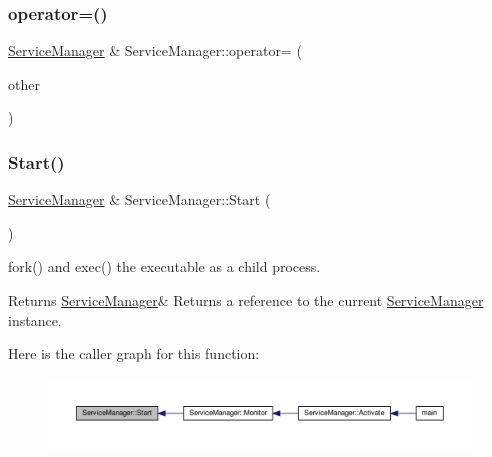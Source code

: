 \subsubsection{\texorpdfstring{operator=()}{operator=()}\hspace{0.1cm}{\footnotesize\ttfamily [2/2]}}
{\footnotesize\ttfamily \hyperlink{classServiceManager}{Service\+Manager} \& Service\+Manager\+::operator= (\begin{DoxyParamCaption}\item[{\hyperlink{classServiceManager}{Service\+Manager} \&\&}]{other }\end{DoxyParamCaption})}

\mbox{\label{classServiceManager_a57a9b4739ef6da5f70bef63a6b878b41}} 
\subsubsection{\texorpdfstring{Start()}{Start()}}
{\footnotesize\ttfamily \hyperlink{classServiceManager}{Service\+Manager} \& Service\+Manager\+::\+Start (\begin{DoxyParamCaption}{ }\end{DoxyParamCaption})\hspace{0.3cm}{\ttfamily [private]}}

fork() and exec() the executable as a child process.

\begin{DoxyReturn}{Returns}
\hyperlink{classServiceManager}{Service\+Manager}\& Returns a reference to the current \hyperlink{classServiceManager}{Service\+Manager} instance. 
\end{DoxyReturn}
Here is the caller graph for this function\+:
\nopagebreak
\begin{figure}[H]
\begin{center}
\leavevmode
\includegraphics[width=350pt]{classServiceManager_a57a9b4739ef6da5f70bef63a6b878b41_icgraph}
\end{center}
\end{figure}
\mbox{\label{classServiceManager_abdeb5c08d4a1243f43477cda8109446a}} 
